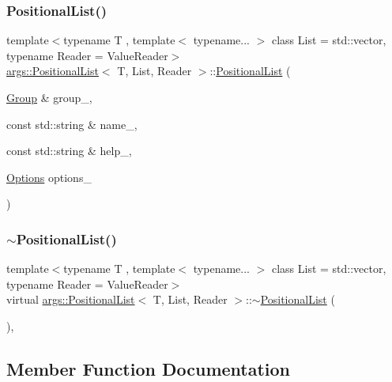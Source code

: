 \subsubsection{\texorpdfstring{Positional\+List()}{PositionalList()}\hspace{0.1cm}{\footnotesize\ttfamily [2/2]}}
{\footnotesize\ttfamily template$<$typename T , template$<$ typename... $>$ class List = std\+::vector, typename Reader  = Value\+Reader$>$ \\
\hyperlink{classargs_1_1_positional_list}{args\+::\+Positional\+List}$<$ T, List, Reader $>$\+::\hyperlink{classargs_1_1_positional_list}{Positional\+List} (\begin{DoxyParamCaption}\item[{\hyperlink{classargs_1_1_group}{Group} \&}]{group\+\_\+,  }\item[{const std\+::string \&}]{name\+\_\+,  }\item[{const std\+::string \&}]{help\+\_\+,  }\item[{\hyperlink{namespaceargs_aa530c0f95194aa275f49a5f299ac9e77}{Options}}]{options\+\_\+ }\end{DoxyParamCaption})\hspace{0.3cm}{\ttfamily [inline]}}

\mbox{\label{classargs_1_1_positional_list_a5675c4843b00ca95234e5187dfffacda}} 
\subsubsection{\texorpdfstring{$\sim$\+Positional\+List()}{~PositionalList()}}
{\footnotesize\ttfamily template$<$typename T , template$<$ typename... $>$ class List = std\+::vector, typename Reader  = Value\+Reader$>$ \\
virtual \hyperlink{classargs_1_1_positional_list}{args\+::\+Positional\+List}$<$ T, List, Reader $>$\+::$\sim$\hyperlink{classargs_1_1_positional_list}{Positional\+List} (\begin{DoxyParamCaption}{ }\end{DoxyParamCaption})\hspace{0.3cm}{\ttfamily [inline]}, {\ttfamily [virtual]}}



\subsection{Member Function Documentation}
\mbox{\label{classargs_1_1_positional_list_a13c58afa1b4313727cc451a7e1d624b8}} 

